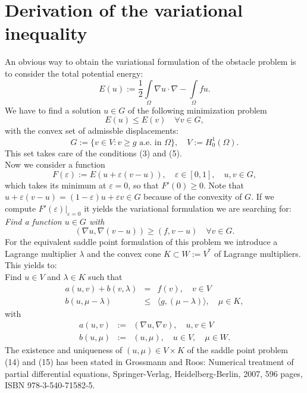 \documentclass{article}
\begin{document}
\section{Derivation of the variational inequality}

An obvious way to obtain the variational formulation of the obstacle problem is to consider the total potential energy:
\begin{equation}
 E(u):=\dfrac{1}{2}\int\limits_{\Omega} \nabla u \cdot \nabla - \int\limits_{\Omega} fu.
\end{equation}
We have to find a solution $u\in G$ of the following minimization problem
\begin{equation}
 E(u)\leq E(v)\quad \forall v\in G,
\end{equation}
with the convex set of admissble displacements:
\begin{equation}
 G:=\lbrace v\in V: v\geq g \text{ a.e. in } \Omega\rbrace,\quad V:=H^1_0(\Omega).
\end{equation}
This set takes care of the conditions (3) and (5).\\
Now we consider a function
\begin{equation}
 F(\varepsilon) := E(u+\varepsilon(v-u)),\quad\varepsilon\in\left[0,1\right],\quad u,v\in G,
\end{equation}
which takes its minimum at $\varepsilon = 0$, so that $F'(0)\geq 0$. Note that $u+\varepsilon(v-u) = (1-\varepsilon)u+\varepsilon v\in G$ because of the convexity of $G$. If we compute $F'(\varepsilon)\vert_{\varepsilon=0}$ it yields the variational formulation we are searching for:\\
\textit{Find a function $u\in G$ with}
\begin{equation}
 \left(\nabla u, \nabla(v-u)\right) \geq \left(f,v-u\right) \quad \forall v\in G.
\end{equation}
For the equivalent saddle point formulation of this problem we introduce a Lagrange multiplier $\lambda$ and the convex cone $K\subset W:=V^*$ of Lagrange multipliers. This yields to:\\
Find $u\in V$ and $\lambda\in K$ such that
\begin{eqnarray}
 a(u,v) + b(v,\lambda) &=& f(v),\quad v\in V\\
 b(u,\mu - \lambda) &\leq& \langle g,(\mu - \lambda)\rangle,\quad\mu\in K,
\end{eqnarray}
with
\begin{eqnarray}
 a(u,v) &:=& \left(\nabla u, \nabla v\right),\quad u,v\in V\\
 b(u,\mu) &:=& (u,\mu),\quad u\in V,\quad\mu\in W.
\end{eqnarray}
The existence and uniqueness of $(u,\mu)\in V\times K$ of the saddle point problem (14) and (15) has been stated in Grossmann and Roos: Numerical treatment of partial differential equations, Springer-Verlag, Heidelberg-Berlin, 2007, 596 pages, ISBN 978-3-540-71582-5.
\end{document}
